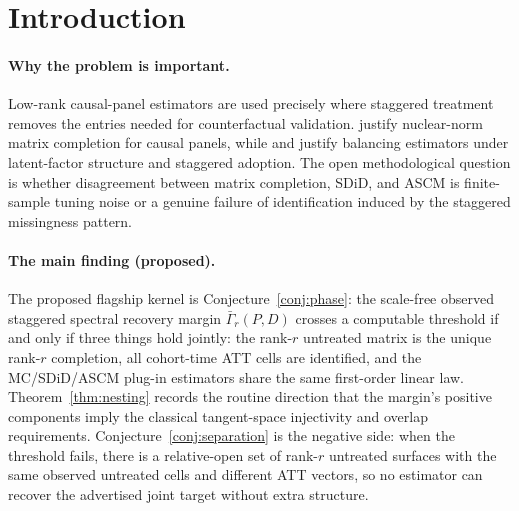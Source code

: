 \documentclass[11pt]{article}
\theoremstyle{definition}
\theoremstyle{plain}
\theoremstyle{remark}
\begin{document}
\section{Introduction}
\paragraph{Why the problem is important.}
Low-rank causal-panel estimators are used precisely where staggered treatment
removes the entries needed for counterfactual validation. \citet{AtheyBayatiDoudchenkoImbensKhosravi2021}
justify nuclear-norm matrix completion for causal panels, while
\citet{ArkhangelskyAtheyHirshbergImbensWager2021} and
\citet{BenMichaelFellerRothstein2022} justify balancing estimators under
latent-factor structure and staggered adoption. The open methodological
question is whether disagreement between matrix completion, SDiD, and ASCM is
finite-sample tuning noise or a genuine failure of identification induced by
the staggered missingness pattern.

\paragraph{The main finding (proposed).}
The proposed flagship kernel is Conjecture~\ref{conj:phase}: the scale-free
observed staggered spectral recovery margin $\bar\Gamma_r(P,D)$ crosses a computable
threshold if and only if three things hold jointly: the rank-$r$ untreated
matrix is the unique rank-$r$ completion, all cohort-time ATT cells are
identified, and the MC/SDiD/ASCM plug-in estimators share the same first-order
linear law. Theorem~\ref{thm:nesting} records the routine direction that the
margin's positive components imply the classical tangent-space injectivity and
overlap requirements. Conjecture~\ref{conj:separation} is the negative side:
when the threshold fails, there is a relative-open set of rank-$r$ untreated
surfaces with the same observed untreated cells and different ATT vectors, so
no estimator can recover the advertised joint target without extra structure.
\end{document}

